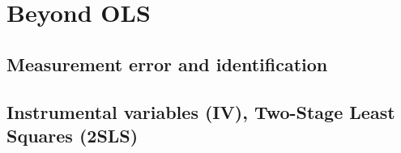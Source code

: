 \chapter{Beyond OLS}\label{chap_BeyondOLS}
\section{Measurement error and identification}
\section{Instrumental variables (IV), Two-Stage Least Squares (2SLS)}




\renewcommand\bibname{Further reading}
\begin{subappendices}


\end{subappendices}